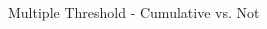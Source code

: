 \documentclass[notes,11pt, aspectratio=169]{beamer}
\begin{document}
\begin{frame}{Multiple Threshold - Cumulative vs. Not}
\begin{columns}[onlytextwidth, T]
\begin{column}{.4\textwidth}
      \end{column}%
    \end{columns}
\end{frame}
\end{document}
